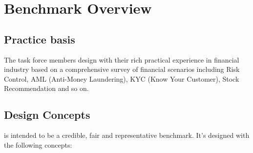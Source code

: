 \chapter{Benchmark Overview}
\label{sec:benchmark-overview}

\section{Practice basis}

The task force members design \ldbcfinbench with their rich practical experience in
financial industry based on a comprehensive survey of financial scenarios including
Risk Control, AML (Anti-Money Laundering), KYC (Know Your Customer), Stock Recommendation
and so on.


\section{Design Concepts}

\ldbcfinbench is intended to be a credible, fair and representative benchmark.
It's designed with the following concepts:

